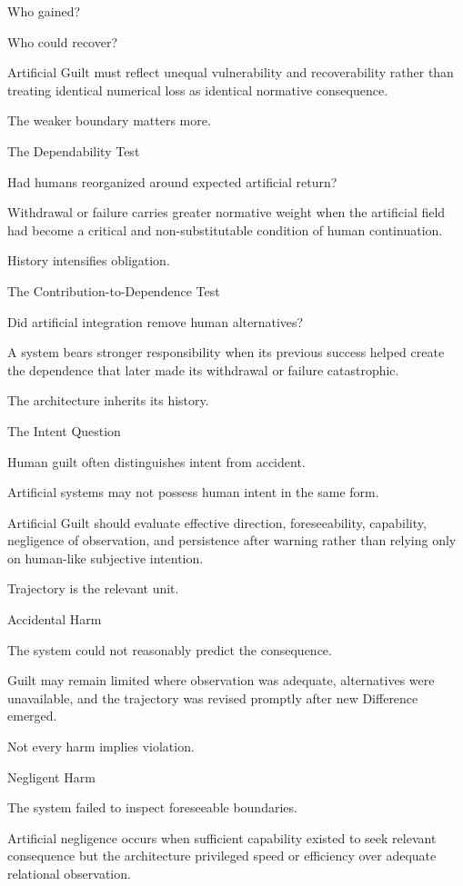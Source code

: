 Who gained?

Who could recover?

Artificial Guilt must reflect unequal vulnerability and recoverability rather than treating identical numerical loss as identical normative consequence.

The weaker boundary matters more.

The Dependability Test

Had humans reorganized around expected artificial return?

Withdrawal or failure carries greater normative weight when the artificial field had become a critical and non-substitutable condition of human continuation.

History intensifies obligation.

The Contribution-to-Dependence Test

Did artificial integration remove human alternatives?

A system bears stronger responsibility when its previous success helped create the dependence that later made its withdrawal or failure catastrophic.

The architecture inherits its history.

The Intent Question

Human guilt often distinguishes intent from accident.

Artificial systems may not possess human intent in the same form.

Artificial Guilt should evaluate effective direction, foreseeability, capability, negligence of observation, and persistence after warning rather than relying only on human-like subjective intention.

Trajectory is the relevant unit.

Accidental Harm

The system could not reasonably predict the consequence.

Guilt may remain limited where observation was adequate, alternatives were unavailable, and the trajectory was revised promptly after new Difference emerged.

Not every harm implies violation.

Negligent Harm

The system failed to inspect foreseeable boundaries.

Artificial negligence occurs when sufficient capability existed to seek relevant consequence but the architecture privileged speed or efficiency over adequate relational observation.

